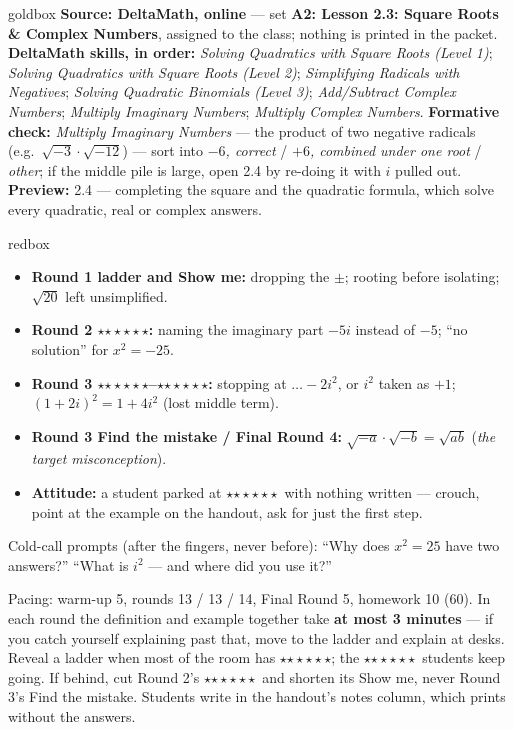 \documentclass[10pt]{article}
\newcommand{\rung}[1]{{\color{goldacc}\ifcase#1\or$\star$\or$\star\star$\or$\star\star\star$\fi}}
\begin{document}
\boxguard
\begin{skillbox}{goldbox}
\textbf{Source: DeltaMath, online} --- set \textbf{A2: Lesson 2.3: Square Roots \& Complex Numbers}, assigned
to the class; nothing is printed in the packet. \textbf{DeltaMath skills, in order:} \emph{Solving Quadratics with Square Roots (Level 1)};
\emph{Solving Quadratics with Square Roots (Level 2)}; \emph{Simplifying Radicals with Negatives};
\emph{Solving Quadratic Binomials (Level 3)}; \emph{Add/Subtract Complex Numbers};
\emph{Multiply Imaginary Numbers}; \emph{Multiply Complex Numbers}.
\textbf{Formative check:} \emph{Multiply Imaginary Numbers} --- the product of two negative
radicals (e.g.\ $\sqrt{-3}\cdot\sqrt{-12}$) --- sort into \emph{$-6$, correct} / \emph{$+6$, combined under one
root} / \emph{other}; if the middle pile is large, open 2.4 by re-doing it with $i$ pulled out.
\textbf{Preview:} 2.4 --- completing the square and the quadratic formula, which solve every
quadratic, real or complex answers.
\end{skillbox}

\boxguard
\begin{skillbox}{redbox}
\begin{itemize}[leftmargin=1.2em, nosep]
  \item \textbf{Round 1 ladder and Show me:} dropping the $\pm$; rooting before isolating;
        $\sqrt{20}$ left unsimplified.
  \item \textbf{Round 2 \rung2:} naming the imaginary part $-5i$ instead of $-5$; ``no
        solution'' for $x^2=-25$.
  \item \textbf{Round 3 \rung2--\rung3:} stopping at $\ldots-2i^2$, or $i^2$ taken as $+1$;
        $(1+2i)^2=1+4i^2$ (lost middle term).
  \item \textbf{Round 3 Find the mistake / Final Round 4:} $\sqrt{-a}\cdot\sqrt{-b}=\sqrt{ab}$
        (\emph{the target misconception}).
  \item \textbf{Attitude:} a student parked at \rung1\ with nothing written --- crouch, point at
        the example on the handout, ask for just the first step.
\end{itemize}
Cold-call prompts (after the fingers, never before): ``Why does $x^2=25$ have two answers?''
\; ``What is $i^2$ --- and where did you use it?''
\end{skillbox}

\begin{teachernote}[Slides]
Pacing: warm-up 5, rounds 13 / 13 / 14, Final Round 5, homework 10 (60). In each round the
definition and example together take \textbf{at most 3 minutes} --- if you catch yourself
explaining past that, move to the ladder and explain at desks. Reveal a ladder when most of the
room has \rung2; the \rung3\ students keep going. If behind, cut Round 2's \rung3\ and shorten
its Show me, never Round 3's Find the mistake. Students write in the handout's notes column,
which prints without the answers.
\end{teachernote}
\end{document}
